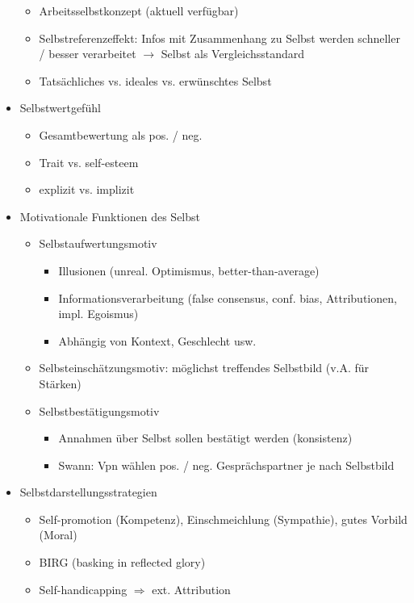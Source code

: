 \documentclass[11pt, paper=a4, twocolumn]{scrartcl}
\begin{document}
\begin{itemize}
\begin{itemize}
					\item Arbeitsselbstkonzept (aktuell verfügbar)
					\item Selbstreferenzeffekt: Infos mit Zusammenhang zu Selbst werden schneller / besser verarbeitet
						$\rightarrow$ Selbst als Vergleichsstandard
					\item Tatsächliches vs. ideales vs. erwünschtes Selbst
				\end{itemize}
			\item Selbstwertgefühl
				\begin{itemize}
					\item Gesamtbewertung als pos. / neg.
					\item Trait vs. self-esteem
					\item explizit vs. implizit
				\end{itemize}
			\item Motivationale Funktionen des Selbst
				\begin{itemize}
					\item Selbstaufwertungsmotiv
						\begin{itemize}
							\item Illusionen (unreal. Optimismus, better-than-average)
							\item Informationsverarbeitung (false consensus, conf. bias, Attributionen, impl. Egoismus)
							\item Abhängig von Kontext, Geschlecht usw.
						\end{itemize}
					\item Selbsteinschätzungsmotiv: möglichst treffendes Selbstbild (v.A. für Stärken)
					\item Selbstbestätigungsmotiv
						\begin{itemize}
							\item Annahmen über Selbst sollen bestätigt werden (konsistenz)
							\item Swann: Vpn wählen pos. / neg. Gesprächspartner je nach Selbstbild
						\end{itemize}
				\end{itemize}
			\item Selbstdarstellungsstrategien
				\begin{itemize}
					\item Self-promotion (Kompetenz), Einschmeichlung (Sympathie), gutes Vorbild (Moral)
					\item BIRG (basking in reflected glory)
					\item Self-handicapping $\Rightarrow$ ext. Attribution

\end{itemize}
\end{itemize}
\end{document}
